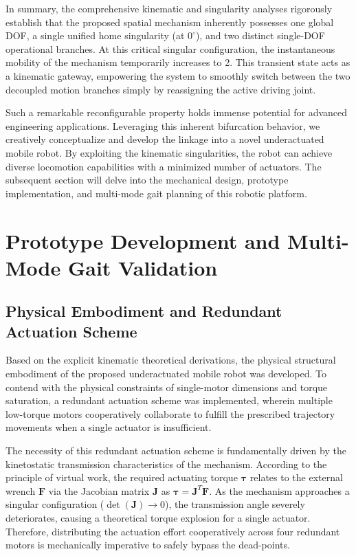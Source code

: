 \documentclass[a4paper,fleqn]{cas-sc}
\begin{document}
In summary, the comprehensive kinematic and singularity analyses rigorously establish that the proposed spatial mechanism inherently possesses one global DOF, a single unified home singularity (at $0^\circ$), and two distinct single-DOF operational branches. At this critical singular configuration, the instantaneous mobility of the mechanism temporarily increases to 2. This transient state acts as a kinematic gateway, empowering the system to smoothly switch between the two decoupled motion branches simply by reassigning the active driving joint. 

Such a remarkable reconfigurable property holds immense potential for advanced engineering applications. Leveraging this inherent bifurcation behavior, we creatively conceptualize and develop the linkage into a novel underactuated mobile robot. By exploiting the kinematic singularities, the robot can achieve diverse locomotion capabilities with a minimized number of actuators. The subsequent section will delve into the mechanical design, prototype implementation, and multi-mode gait planning of this robotic platform.

\section{Prototype Development and Multi-Mode Gait Validation}

\subsection{Physical Embodiment and Redundant Actuation Scheme}
Based on the explicit kinematic theoretical derivations, the physical structural embodiment of the proposed underactuated mobile robot was developed. To contend with the physical constraints of single-motor dimensions and torque saturation, a redundant actuation scheme was implemented, wherein multiple low-torque motors cooperatively collaborate to fulfill the prescribed trajectory movements when a single actuator is insufficient. 

The necessity of this redundant actuation scheme is fundamentally driven by the kinetostatic transmission characteristics of the mechanism. According to the principle of virtual work, the required actuating torque $\boldsymbol{\tau}$ relates to the external wrench $\boldsymbol{F}$ via the Jacobian matrix $\boldsymbol{J}$ as $\boldsymbol{\tau} = \boldsymbol{J}^T \boldsymbol{F}$. As the mechanism approaches a singular configuration ($\det(\boldsymbol{J}) \to 0$), the transmission angle severely deteriorates, causing a theoretical torque explosion for a single actuator. Therefore, distributing the actuation effort cooperatively across four redundant motors is mechanically imperative to safely bypass the dead-points.
\end{document}
